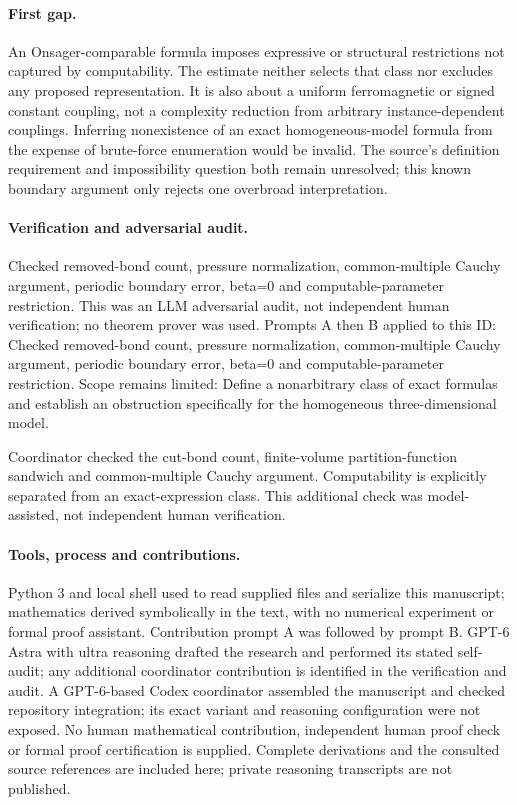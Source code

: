 \documentclass[11pt]{article}
\begin{document}
\paragraph{First gap.}An Onsager-comparable formula imposes expressive or structural restrictions not captured by computability. The estimate neither selects that class nor excludes any proposed representation. It is also about a uniform ferromagnetic or signed constant coupling, not a complexity reduction from arbitrary instance-dependent couplings. Inferring nonexistence of an exact homogeneous-model formula from the expense of brute-force enumeration would be invalid. The source's definition requirement and impossibility question both remain unresolved; this known boundary argument only rejects one overbroad interpretation.

\paragraph{Verification and adversarial audit.}
Checked removed-bond count, pressure normalization, common-multiple Cauchy argument, periodic boundary error, beta=0 and computable-parameter restriction. This was an LLM adversarial audit, not independent human verification; no theorem prover was used. Prompts A then B applied to this ID: Checked removed-bond count, pressure normalization, common-multiple Cauchy argument, periodic boundary error, beta=0 and computable-parameter restriction. Scope remains limited: Define a nonarbitrary class of exact formulas and establish an obstruction specifically for the homogeneous three-dimensional model.

Coordinator checked the cut-bond count, finite-volume partition-function sandwich and common-multiple Cauchy argument. Computability is explicitly separated from an exact-expression class. This additional check was model-assisted, not independent human verification.

\paragraph{Tools, process and contributions.}
Python 3 and local shell used to read supplied files and serialize this manuscript; mathematics derived symbolically in the text, with no numerical experiment or formal proof assistant. Contribution prompt A was followed by prompt B. GPT-6 Astra with ultra reasoning drafted the research and performed its stated self-audit; any additional coordinator contribution is identified in the verification and audit. A GPT-6-based Codex coordinator assembled the manuscript and checked repository integration; its exact variant and reasoning configuration were not exposed. No human mathematical contribution, independent human proof check or formal proof certification is supplied. Complete derivations and the consulted source references are included here; private reasoning transcripts are not published.
\end{document}
